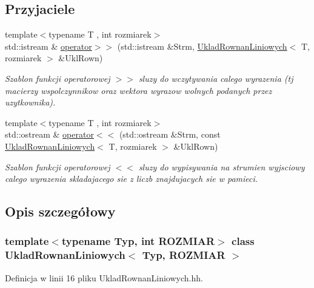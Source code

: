 \subsection*{Przyjaciele}
\begin{DoxyCompactItemize}
\item 
{\footnotesize template$<$typename T , int rozmiarek$>$ }\\std::istream \& \hyperlink{class_uklad_rownan_liniowych_a5e3f1731c16e7f2a693237da0429dbb1}{operator$>$$>$} (std::istream \&Strm, \hyperlink{class_uklad_rownan_liniowych}{UkladRownanLiniowych}$<$ T, rozmiarek $>$ \&UklRown)
\begin{DoxyCompactList}\small\item\em Szablon funkcji operatorowej $>$$>$ sluzy do wczytywania calego wyrazenia (tj macierzy wspolczynnikow oraz wektora wyrazow wolnych podanych przez uzytkownika). \item\end{DoxyCompactList}\item 
{\footnotesize template$<$typename T , int rozmiarek$>$ }\\std::ostream \& \hyperlink{class_uklad_rownan_liniowych_abf2a11f9dfab38690e476c7243a1c95d}{operator$<$$<$} (std::ostream \&Strm, const \hyperlink{class_uklad_rownan_liniowych}{UkladRownanLiniowych}$<$ T, rozmiarek $>$ \&UklRown)
\begin{DoxyCompactList}\small\item\em Szablon funkcji operatorowej $<$$<$ sluzy do wypisywania na strumien wyjsciowy calego wyrazenia skladajacego sie z liczb znajdujacych sie w pamieci. \item\end{DoxyCompactList}\end{DoxyCompactItemize}


\subsection{Opis szczegółowy}
\subsubsection*{template$<$typename Typ, int ROZMIAR$>$ class UkladRownanLiniowych$<$ Typ, ROZMIAR $>$}



Definicja w linii 16 pliku UkladRownanLiniowych.hh.



